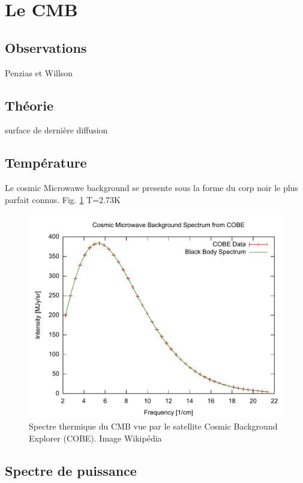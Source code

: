 \section{Le CMB}


\subsection{Observations}

Penzias et Willson

\subsection{Théorie}

surface de dernière diffusion


\subsection{Température}
Le cosmic Microwawe background se presente sous la forme du corp noir le plus parfait connus.
Fig. \ref{fig:cmb_thermal_spectrum}
T=2.73K


\begin{figure}[bth]
        \includegraphics[width=.95\linewidth]{img/01/Cmbr.pdf} 
        \caption{Spectre thermique du CMB vue par le satellite Cosmic Background Explorer (COBE). 
        Image Wikipédia}
 		\label{fig:cmb_thermal_spectrum}
\end{figure}




\subsection{Spectre de puissance}

